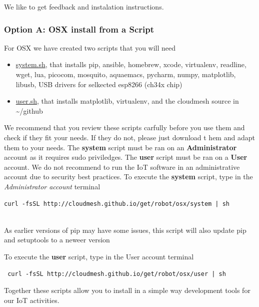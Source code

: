 We like to get feedback and instalation instructions.

\subsubsection{Option A: OSX install from a
Script}\label{option-a-osx-install-from-a-script}

For OSX we have created two scripts that you will need

\begin{itemize}
\tightlist
\item
  \href{http://cloudmesh.github.io/get/robot/osx/system/}{system.sh},
  that installs pip, ansible, homebrew, xcode, virtualenv, readline,
  wget, lua, picocom, mosquito, aquaemacs, pycharm, numpy, matplotlib,
  libusb, USB drivers for selkected esp8266 (ch34x chip)
\item
  \href{http://cloudmesh.github.io/get/robot/osx/user}{user.sh}, that
  installs matplotlib, virtualenv, and the cloudmesh source in
  \textasciitilde{}/github
\end{itemize}

We recommend that you review these scripts carfully before you use them
and check if they fit your needs. If they do not, please just download t
hem and adapt them to your needs. The \textbf{system} script must be ran
on an \textbf{Administrator} account as it requires sudo priviledges.
The \textbf{user} script must be ran on a \textbf{User} account. We do
not recommend to run the IoT software in an administrative account due
to security best practices. To execute the \textbf{system} script, type
in the \emph{Administrator account} terminal

\begin{verbatim}
curl -fsSL http://cloudmesh.github.io/get/robot/osx/system | sh
    
\end{verbatim}

As earlier versions of pip may have some issues, this script will also
update pip and setuptools to a neweer version

To execute the \textbf{user} script, type in the User account terminal

\begin{verbatim}
 curl -fsSL http://cloudmesh.github.io/get/robot/osx/user | sh
\end{verbatim}

Together these scripts allow you to install in a simple way development
tools for our IoT activities.

